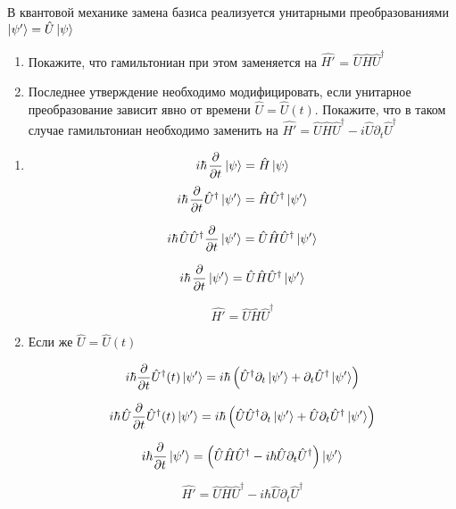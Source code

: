 \begin{exercise}
	В квантовой механике замена базиса реализуется унитарными преобразованиями $\ket{\psi'} = \hat{U}\ket{\psi}$

	\begin{enumerate}
		\item
		Покажите, что гамильтониан при этом заменяется на $\hat{H'}$ = $\hat{U}$$\hat{H}$$\hat{U}^\dagger$
		\item 
		Последнее утверждение необходимо модифицировать, если унитарное преобразование зависит явно от времени $\hat{U}=\hat{U}(t)$. Покажите, что в таком случае гамильтониан необходимо заменить на $\hat{H'} = \hat{U}\hat{H}\hat{U}^\dagger  - i\hat{U} \partial_t \hat{U}^\dagger$
	\end{enumerate}

	\begin{solution}
		\begin{enumerate}
			\item
		
		$$
		i \hbar \hspace{1pt} \frac{\partial }{\partial t} \ket{\psi} = \hat{H} \ket{\psi}
		$$
		$$
		i \hbar \hspace{1pt} \frac{\partial }{\partial t} \hat{U}^\dagger \ket{\psi'} = \hat{H} \hat{U}^\dagger \ket{\psi'}
		$$
		
		$$
		i \hbar \hspace{1pt} \hat{U} \hat{U}^\dagger \frac{\partial }{\partial t}  \ket{\psi'} = \hat{U} \hat{H} \hat{U}^\dagger \ket{\psi'}
		$$
		
		$$
		i \hbar \hspace{1pt} \frac{\partial }{\partial t}  \ket{\psi'} = \hat{U} \hat{H} \hat{U}^\dagger \ket{\psi'}
		$$
		
		$$
		\hat{H'} = \hat{U} \hat{H} \hat{U}^\dagger
		$$
		\item 
		
		Если же $\hat{U}=\hat{U}(t)$
		
		$$
		i \hbar \frac{\partial}{\partial t} \hat{U}^\dagger(t) \ket{\psi'} =i\hbar\left(\hat{U}^\dagger \partial_t \ket{\psi'} + \partial_t \hat{U}^\dagger \ket{\psi'}\right)
		$$
		
		$$
		i \hbar \hspace{1pt}  \hat{U} \frac{\partial}{\partial t} \hat{U}^\dagger(t) \ket{\psi'} =i\hbar\left(\hat{U}\hat{U}^\dagger \partial_t \ket{\psi'} + \hat{U} \partial_t \hat{U}^\dagger \ket{\psi'}\right)
		$$
		
		$$
		i \hbar \frac{\partial}{\partial t} \ket{\psi'} = \left(\hat{U}\hat{H}\hat{U}^\dagger  - i \hbar\hat{U} \partial_t \hat{U}^\dagger\right) \ket{\psi'}
		$$
		
		$$\hat{H'} = \hat{U}\hat{H}\hat{U}^\dagger  - i \hbar \hat{U} \partial_t \hat{U}^\dagger$$
		
			
	\end{enumerate}
\end{solution}
\end{exercise}



